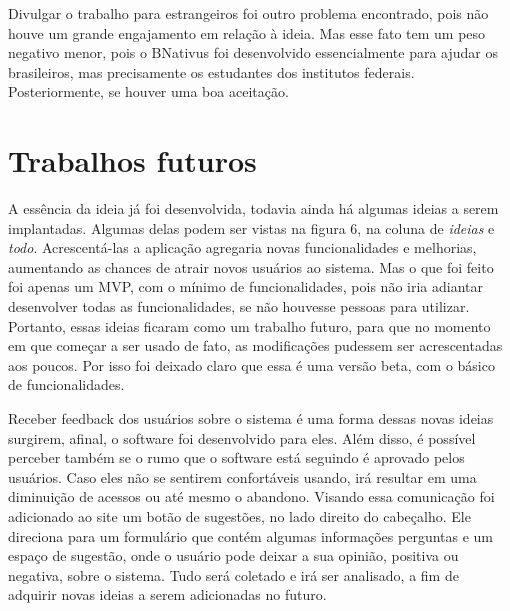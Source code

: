 Divulgar o trabalho para estrangeiros foi outro problema encontrado, pois não houve um grande engajamento em relação à ideia. Mas esse fato tem um peso negativo menor, pois o BNativus foi desenvolvido essencialmente para ajudar os brasileiros, mas precisamente os estudantes dos institutos federais. Posteriormente, se houver uma boa aceitação.


\section{Trabalhos futuros}

A essência da ideia já foi desenvolvida, todavia ainda há algumas ideias a serem implantadas. Algumas delas podem ser vistas na figura 6, na coluna de \textit{ideias} e \textit{todo}. Acrescentá-las a aplicação agregaria novas funcionalidades e melhorias, aumentando as chances de atrair novos usuários ao sistema. Mas o que foi feito foi apenas um MVP, com o mínimo de funcionalidades, pois não iria adiantar desenvolver todas as funcionalidades, se não houvesse pessoas para utilizar. Portanto, essas ideias ficaram como um trabalho futuro, para que no momento em que começar a ser usado de fato, as modificações pudessem ser acrescentadas aos poucos. Por isso foi deixado claro que essa é uma versão beta, com o básico de funcionalidades.

Receber feedback dos usuários sobre o sistema é uma forma dessas novas ideias surgirem, afinal, o software foi desenvolvido para eles. Além disso, é possível perceber também se o rumo que o software está seguindo é aprovado pelos usuários. Caso eles não se sentirem confortáveis usando, irá resultar em uma diminuição de acessos ou até mesmo o abandono. Visando essa comunicação foi adicionado ao site um botão de sugestões, no lado direito do cabeçalho. Ele direciona para um formulário que contém algumas informações perguntas e um espaço de sugestão, onde o usuário pode deixar a sua opinião, positiva ou negativa, sobre o sistema. Tudo será coletado e irá ser analisado, a fim de adquirir novas ideias a serem adicionadas no futuro.

